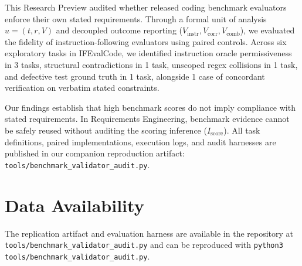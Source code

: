 \documentclass[runningheads]{llncs}
\begin{document}
This Research Preview audited whether released coding benchmark evaluators enforce their own stated requirements. Through a formal unit of analysis $u = (t, r, V)$ and decoupled outcome reporting ($V_{\text{instr}}, V_{\text{corr}}, V_{\text{comb}}$), we evaluated the fidelity of instruction-following evaluators using paired controls. Across six exploratory tasks in IFEvalCode, we identified instruction oracle permissiveness in 3 tasks, structural contradictions in 1 task, unscoped regex collisions in 1 task, and defective test ground truth in 1 task, alongside 1 case of concordant verification on verbatim stated constraints.

Our findings establish that high benchmark scores do not imply compliance with stated requirements. In Requirements Engineering, benchmark evidence cannot be safely reused without auditing the scoring inference ($I_{\text{score}}$). All task definitions, paired implementations, execution logs, and audit harnesses are published in our companion reproduction artifact: \texttt{tools/benchmark\_validator\_audit.py}.

\section*{Data Availability}
The replication artifact and evaluation harness are available in the repository at \texttt{tools/benchmark\_validator\_audit.py} and can be reproduced with \texttt{python3 tools/benchmark\_validator\_audit.py}.



\end{document}
